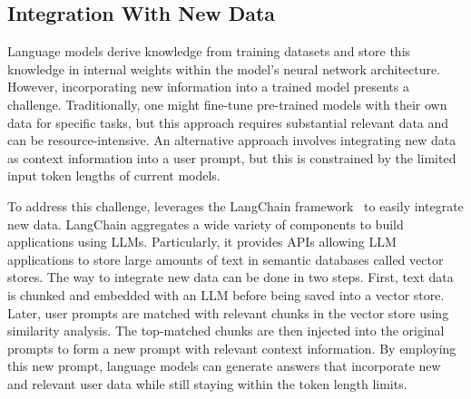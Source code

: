 \vspace{-25pt}
\subsection{Integration With New Data}

Language models derive knowledge from training datasets and store this knowledge in internal weights within the model's neural network architecture. However, incorporating new information into a trained model presents a challenge. Traditionally, one might fine-tune pre-trained models with their own data for specific tasks, but this approach requires substantial relevant data and can be resource-intensive. An alternative approach involves integrating new data as context information into a user prompt, but this is constrained by the limited input token lengths of current models.

To address this challenge, \ourwork leverages the LangChain framework~\cite{langchain2023} to easily integrate new data. LangChain aggregates a wide variety of components to build applications using LLMs. Particularly, it provides APIs allowing LLM applications to store large amounts of text in semantic databases called vector stores. 
The way to integrate new data can be done in two steps. First, text data is chunked and embedded with an LLM before being saved into a vector store. 
Later, user prompts are matched with relevant chunks in the vector store using similarity analysis. 
The top-matched chunks are then injected into the original prompts to form a new prompt with relevant context information. By employing this new prompt, language models can generate answers that incorporate new and relevant user data while still staying within the token length limits.

